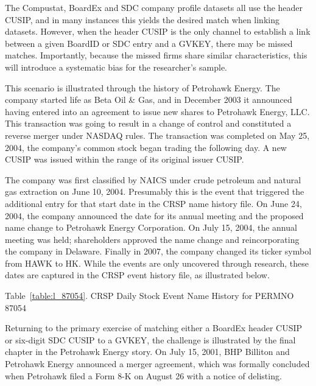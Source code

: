 \documentclass[12pt]{article}
\begin{document}
The Compustat, BoardEx and SDC company profile datasets all use the header CUSIP, and in many instances this yields the desired match when linking datasets.
However, when the header CUSIP is the only channel to establish a link between a given BoardID or SDC entry and a GVKEY, there may be missed matches.
Importantly, because the missed firms share similar characteristics, this will introduce a systematic bias for the researcher's sample.


This scenario is illustrated through the history of Petrohawk Energy.
The company started life as Beta Oil \& Gas, and in December 2003 it announced having entered into an agreement to issue new shares to Petrohawk Energy, LLC.
This transaction was going to result in a change of control and constituted a reverse merger under NASDAQ rules.
The transaction was completed on May 25, 2004, the company's common stock began trading the following day.
A new CUSIP was issued within the range of its original issuer CUSIP.

The company was first classified by NAICS under crude petroleum and natural gas extraction on June 10, 2004.
Presumably this is the event that triggered the additional entry for that start date in the CRSP name history file. 
On June 24, 2004, the company announced the date for its annual meeting and the proposed name change to Petrohawk Energy Corporation.
On July 15, 2004, the annual meeting was held; shareholders approved the name change and reincorporating the company in Delaware.
Finally in 2007, the company changed its ticker symbol from HAWK to HK.
While the events are only uncovered through research, these dates are captured in the CRSP event history file, as illustrated below.

\begin{center}\label{table:l_87054}
Table~\ref{table:l_87054}. CRSP Daily Stock Event Name History for PERMNO 87054

\end{center}

Returning to the primary exercise of matching either a BoardEx header CUSIP or six-digit SDC CUSIP to a GVKEY, the challenge is illustrated by the final chapter in the Petrohawk Energy story.
On July 15, 2001, BHP Billiton and Petrohawk Energy announced a merger agreement, which was formally concluded when Petrohawk filed a Form 8-K on August 26 with a notice of delisting.
\end{document}
